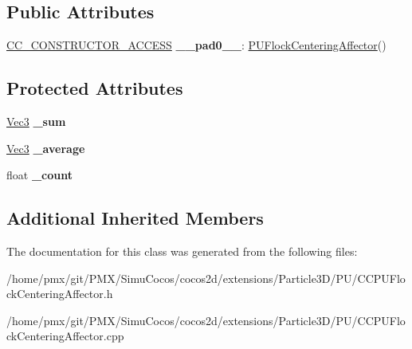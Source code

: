 \subsection*{Public Attributes}
\begin{DoxyCompactItemize}
\item 
\mbox{\label{classPUFlockCenteringAffector_a432d724c92ba584189bf49b41cf029e5}} 
\hyperlink{_2cocos2d_2cocos_2base_2ccConfig_8h_a25ef1314f97c35a2ed3d029b0ead6da0}{C\+C\+\_\+\+C\+O\+N\+S\+T\+R\+U\+C\+T\+O\+R\+\_\+\+A\+C\+C\+E\+SS} {\bfseries \+\_\+\+\_\+pad0\+\_\+\+\_\+}\+: \hyperlink{classPUFlockCenteringAffector}{P\+U\+Flock\+Centering\+Affector}()
\end{DoxyCompactItemize}
\subsection*{Protected Attributes}
\begin{DoxyCompactItemize}
\item 
\mbox{\label{classPUFlockCenteringAffector_aacb9f9280ec21b85003f95c2258f6224}} 
\hyperlink{classVec3}{Vec3} {\bfseries \+\_\+sum}
\item 
\mbox{\label{classPUFlockCenteringAffector_ab9e5667d92d80f390b69b0f9646ee1cf}} 
\hyperlink{classVec3}{Vec3} {\bfseries \+\_\+average}
\item 
\mbox{\label{classPUFlockCenteringAffector_acd6dc5ef732b838e8e84984403afa261}} 
float {\bfseries \+\_\+count}
\end{DoxyCompactItemize}
\subsection*{Additional Inherited Members}


The documentation for this class was generated from the following files\+:\begin{DoxyCompactItemize}
\item 
/home/pmx/git/\+P\+M\+X/\+Simu\+Cocos/cocos2d/extensions/\+Particle3\+D/\+P\+U/C\+C\+P\+U\+Flock\+Centering\+Affector.\+h\item 
/home/pmx/git/\+P\+M\+X/\+Simu\+Cocos/cocos2d/extensions/\+Particle3\+D/\+P\+U/C\+C\+P\+U\+Flock\+Centering\+Affector.\+cpp\end{DoxyCompactItemize}
